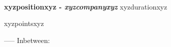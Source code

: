 \textbf{\\ xyzpositionxyz - \textit{xyzcompanyxyz}}  
\hfill xyzdurationxyz
\begin{itemize}
xyzpointsxyz
\end{itemize}
-----
Inbetween: \vspace{-8pt}